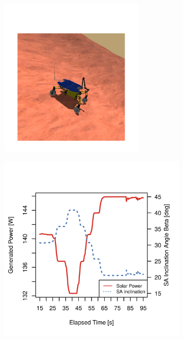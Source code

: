 \begin{figure}[h]
\captionsetup[subfigure]{justification=centering}
\vspace{-4ex}
	\centering
    \setlength{\subfigureWidth}{0.50\textwidth}
    \setlength{\graphicsHeight}{74mm}
    \hypersetup{hidelinks=true}%
    \begin{subfigure}[t]{\subfigureWidth}
        \centering
        \includegraphics[height=77mm]{sections/power-system-design/simulation/images/counter-slope.png}
		\label{fig:sub:rover-slope-compensation-simulation}
    \end{subfigure}\hfill
    \begin{subfigure}[t]{\subfigureWidth}
        \centering
        \includegraphics[height=\graphicsHeight]{sections/power-system-design/simulation/plots/slope-compensation.png}

\end{subfigure}
\end{figure}
